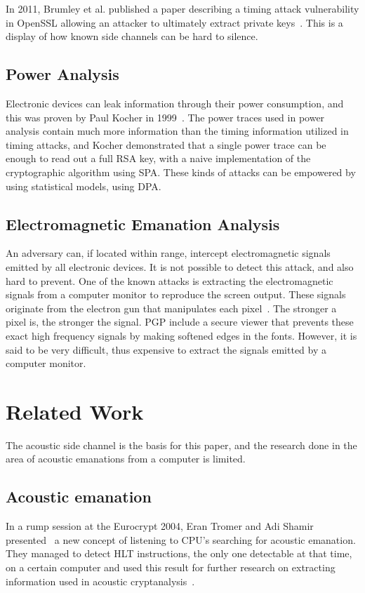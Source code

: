 In 2011, Brumley et al. published a paper describing a timing attack vulnerability in OpenSSL allowing an attacker to ultimately extract private keys~\cite{DBLP:conf/esorics/BrumleyT11}.
This is a display of how known side channels can be hard to silence.


\subsection{Power Analysis}\label{chp2:subsec:power_analysis}
Electronic devices can leak information through their power consumption, and this was proven by Paul Kocher in 1999~\cite{DBLP:conf/crypto/KocherJJ99}.
The power traces used in power analysis contain much more information than the timing information utilized in timing attacks, and Kocher demonstrated that a single power trace can be enough to read out a full RSA key, with a naive implementation of the cryptographic algorithm using \gls{SPA}.
These kinds of attacks can be empowered by using statistical models, using \gls{DPA}.


\subsection{Electromagnetic Emanation Analysis}\label{chp2:subsec:electromagnetic_attacks}
An adversary can, if located within range, intercept electromagnetic signals emitted by all electronic devices. 
It is not possible to detect this attack, and also hard to prevent. 
One of the known attacks is extracting the electromagnetic signals from a computer monitor to reproduce the screen output.
These signals originate from the electron gun that manipulates each pixel~\cite{url:tempest_sans}. 
The stronger a pixel is, the stronger the signal.
PGP include a secure viewer that prevents these exact high frequency signals by making softened edges in the fonts.
However, it is said to be very difficult, thus expensive to extract the signals emitted by a computer monitor. 


\section{Related Work}\label{chp2:sec:related_work}
The acoustic side channel is the basis for this paper, and the research done in the area of acoustic emanations from a computer is limited.

\subsection{Acoustic emanation}
In a rump session at the Eurocrypt 2004, Eran Tromer and Adi Shamir presented~\cite{tromer2004acoustic} a new concept of listening to CPU's searching for acoustic emanation. 
They managed to detect HLT instructions, the only one detectable at that time, on a certain computer and used this result for further research on extracting information used in acoustic cryptanalysis~\cite{tromer2007hardware}.

